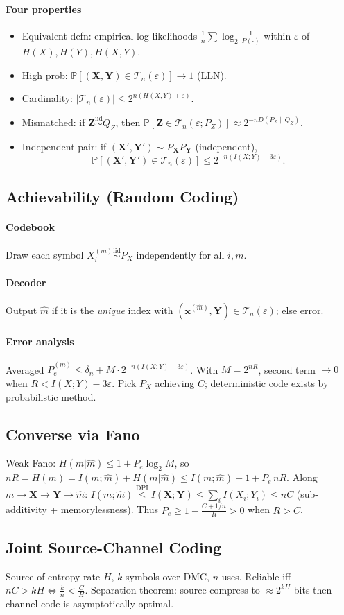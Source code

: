 \paragraph{Four properties}
\begin{itemize}
  \item \textcolor{Bittersweet}{Equivalent defn}: empirical log-likelihoods
    $\tfrac{1}{n}\sum\log_2\tfrac{1}{P(\cdot)}$ within $\varepsilon$ of $H(X),H(Y),H(X,Y)$.
  \item \textcolor{Bittersweet}{High prob}: $\mathbb P[(\mathbf X,\mathbf Y)\in\mathcal T_n(\varepsilon)]\to 1$ (LLN).
  \item \textcolor{Bittersweet}{Cardinality}: $|\mathcal T_n(\varepsilon)|\le 2^{n(H(X,Y)+\varepsilon)}$.
  \item \textcolor{Bittersweet}{Mismatched}: if $\mathbf Z\stackrel{\text{iid}}{\sim}Q_Z$, then $\mathbb P[\mathbf Z\in\mathcal T_n(\varepsilon;P_Z)]\approx 2^{-nD(P_Z\|Q_Z)}$.
  \item \textcolor{Bittersweet}{Independent pair}: if
    $(\mathbf X',\mathbf Y')\sim P_{\mathbf X}P_{\mathbf Y}$ (independent),
    \[\mathbb P[(\mathbf X',\mathbf Y')\!\in\!\mathcal T_n(\varepsilon)]\le 2^{-n(I(X;Y)-3\varepsilon)}.\]
\end{itemize}
\subsection{Achievability (Random Coding)}
\paragraph{Codebook}
Draw each symbol $X_i^{(m)}\stackrel{\text{iid}}{\sim}P_X$ independently for all $i,m$.
\paragraph{Decoder}
Output $\hat m$ if it is the \emph{unique} index with
$(\mathbf x^{(\hat m)},\mathbf Y)\in\mathcal T_n(\varepsilon)$; else error.
\paragraph{Error analysis}
Averaged $\overline P_e^{(m)}\le\delta_n+M\cdot 2^{-n(I(X;Y)-3\varepsilon)}$. With $M=2^{nR}$, second term $\to 0$ when $R<I(X;Y)-3\varepsilon$. Pick $P_X$ achieving $C$; deterministic code exists by probabilistic method.

\subsection{Converse via Fano}
Weak Fano: $H(m|\hat m)\le 1+P_e\log_2 M$, so $nR=H(m)=I(m;\hat m)+H(m|\hat m)\le I(m;\hat m)+1+P_e\,nR$.
Along $m\!\to\!\mathbf X\!\to\!\mathbf Y\!\to\!\hat m$: $I(m;\hat m)\overset{\text{DPI}}{\le}I(\mathbf X;\mathbf Y)\le\sum_i I(X_i;Y_i)\le nC$ (sub-additivity + memorylessness). Thus $P_e\ge 1-\tfrac{C+1/n}{R}>0$ when $R>C$.

\subsection{Joint Source-Channel Coding}
Source of entropy rate $H$, $k$ symbols over DMC, $n$ uses. Reliable iff $nC>kH\iff\tfrac{k}{n}<\tfrac{C}{H}$.
\textcolor{Bittersweet}{Separation theorem}: source-compress to $\approx 2^{kH}$ bits then channel-code is asymptotically optimal.
